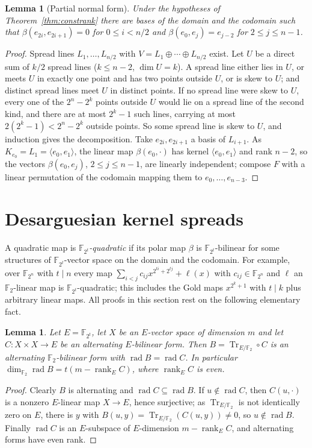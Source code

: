 \documentclass[11pt]{article}
\newtheorem{lemma}[theorem]{Lemma}
\theoremstyle{definition}
\newcommand{\F}{\mathbb{F}}
\DeclareMathOperator{\rad}{rad}
\DeclareMathOperator{\Tr}{Tr}
\DeclareMathOperator{\rk}{rank}
\begin{document}
\begin{lemma}[Partial normal form]\label{lem:normal}
Under the hypotheses of Theorem~\ref{thm:constrank} there are bases of the domain and the
codomain such that $\beta(e_{2i},e_{2i+1})=0$ for $0\le i<n/2$ and
$\beta(e_0,e_j)=e_{j-2}$ for $2\le j\le n-1$.
\end{lemma}
\begin{proof}
Spread lines $L_1,\dots,L_{n/2}$ with $V=L_1\oplus\cdots\oplus L_{n/2}$ exist. Let $U$ be a
direct sum of $k/2$ spread lines ($k\le n-2$, $\dim U=k$). A spread line either lies in $U$,
or meets $U$ in exactly one point and has two points outside $U$, or is skew to $U$; and
distinct spread lines meet $U$ in distinct points. If no spread line were skew to $U$, every
one of the $2^n-2^k$ points outside $U$ would lie on a spread line of the second kind, and
there are at most $2^k-1$ such lines, carrying at most $2(2^k-1)<2^n-2^k$ outside points. So
some spread line is skew to $U$, and induction gives the decomposition. Take $e_{2i},e_{2i+1}$ a
basis of $L_{i+1}$. As $K_{e_0}=L_1=\langle e_0,e_1\rangle$, the linear map $\beta(e_0,\cdot)$ has
kernel $\langle e_0,e_1\rangle$ and rank $n-2$, so the vectors $\beta(e_0,e_j)$, $2\le j\le n-1$,
are linearly independent; compose $F$ with a linear permutation of the codomain mapping them to
$e_0,\dots,e_{n-3}$.
\end{proof}

\section{Desarguesian kernel spreads}\label{sec:f4}
A quadratic map is \emph{$\F_{2^t}$-quadratic} if its polar map $\beta$ is $\F_{2^t}$-bilinear for
some structures of $\F_{2^t}$-vector space on the domain and the codomain. For example, over
$\F_{2^n}$ with $t\mid n$ every map $\sum_{i<j}c_{ij}x^{2^{ti}+2^{tj}}+\ell(x)$ with
$c_{ij}\in\F_{2^n}$ and $\ell$ an $\F_2$-linear map is $\F_{2^t}$-quadratic; this includes the Gold
maps $x^{2^k+1}$ with $t\mid k$ plus arbitrary linear maps. All proofs in this section rest on
the following elementary fact.
\begin{lemma}\label{lem:trace-rad}
Let $E=\F_{2^t}$, let $X$ be an $E$-vector space of dimension $m$ and let $C:X\times X\to E$ be
an alternating $E$-bilinear form. Then $B=\Tr_{E/\F_2}\circ C$ is an alternating $\F_2$-bilinear
form with $\rad B=\rad C$. In particular $\dim_{\F_2}\rad B=t(m-\rk_EC)$, where $\rk_EC$ is even.
\end{lemma}
\begin{proof}
Clearly $B$ is alternating and $\rad C\subseteq\rad B$. If $u\notin\rad C$, then $C(u,\cdot)$ is
a nonzero $E$-linear map $X\to E$, hence surjective; as $\Tr_{E/\F_2}$ is not identically zero on
$E$, there is $y$ with $B(u,y)=\Tr_{E/\F_2}(C(u,y))\neq0$, so $u\notin\rad B$. Finally $\rad C$ is
an $E$-subspace of $E$-dimension $m-\rk_EC$, and alternating forms have even rank.
\end{proof}
\end{document}
